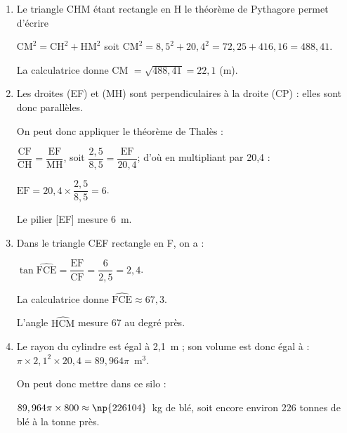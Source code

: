 \documentclass[10pt]{article}
\begin{document}
\medskip

\begin{enumerate}
\item %
Le triangle CHM étant rectangle en H le théorème de Pythagore permet d'écrire 

$\text{CM}^2 = \text{CH}^2 + \text{HM}^2$ soit $\text{CM}^2 = 8,5^2 + 20,4^2 = 72,25 + 416,16 = 488,41$.

La calculatrice donne CM $ = \sqrt{488,41} = 22,1$ (m).
\item %
Les droites (EF) et (MH) sont perpendiculaires à la droite (CP) : elles sont donc parallèles.

On peut donc appliquer le théorème de Thalès :

$\dfrac{\text{CF}}{\text{CH}} = \dfrac{\text{EF}}{\text{MH}}$, soit $\dfrac{2,5}{8,5} = \dfrac{\text{EF}}{20,4}$; d'où en multipliant par 20,4 :

$\text{EF} = 20,4 \times \dfrac{2,5}{8,5} = 6$.

Le pilier [EF] mesure 6~m.
\item %
Dans le triangle CEF rectangle en F, on a :

$\tan \widehat{\text{FCE}} = \dfrac{\text{EF}}{\text{CF}} = \dfrac{6}{2,5} = 2,4$.

La calculatrice donne $\widehat{\text{FCE}}  \approx 67,3$.

L'angle $\widehat{\text{HCM}}$ mesure 67\degres{} au degré près.
\item %


%
%
Le rayon du cylindre est égal à 2,1~m ; son volume est donc égal à : $\pi \times 2,1^2 \times 20,4 = 89,964\pi$~m$^3$.

On peut donc mettre dans ce silo : 

$89,964\pi \times 800 \approx \np{226104}$~kg de blé, soit encore environ 226 tonnes de blé à la tonne près.
\end{enumerate}

\vspace{0,5cm}
\end{document}
